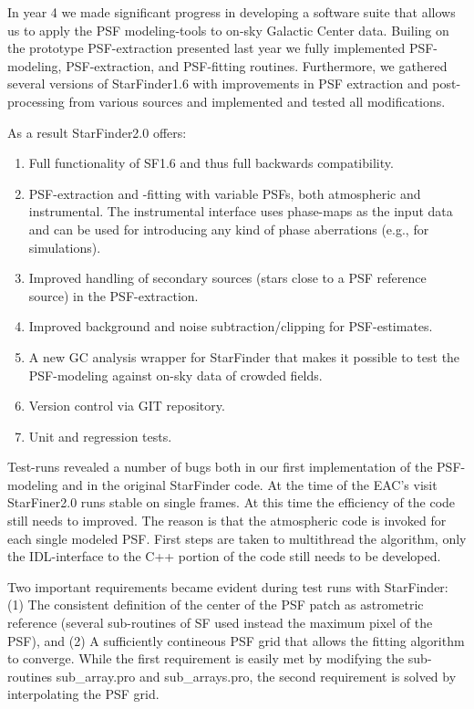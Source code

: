 In year 4 we made significant progress in developing a software suite that allows us to apply the PSF modeling-tools to on-sky Galactic Center data. Builing on the prototype PSF-extraction presented last year we fully implemented PSF-modeling, PSF-extraction, and PSF-fitting routines. Furthermore, we gathered several versions of StarFinder1.6 with improvements in PSF extraction and post-processing from various sources and implemented and tested all modifications.

As a result StarFinder2.0 offers:
\begin{enumerate}
\item Full functionality of SF1.6 and thus full backwards compatibility.
\item PSF-extraction and -fitting with variable PSFs, both atmospheric and instrumental. The instrumental interface uses phase-maps as the input data and can be used for introducing any kind of phase aberrations (e.g., for simulations).
\item Improved handling of secondary sources (stars close to a PSF reference source) in the PSF-extraction.
\item Improved background and noise subtraction/clipping for PSF-estimates.
\item A new GC analysis wrapper for StarFinder that makes it possible to test the PSF-modeling against on-sky data of crowded fields.
\item Version control via GIT repository.
\item Unit and regression tests.
\end{enumerate}
  
Test-runs revealed a number of bugs both in our first implementation of the PSF-modeling and in the original StarFinder code. At the time of the EAC's visit StarFiner2.0 runs stable on single frames. At this time the efficiency of the code still needs to improved. The reason is that the atmospheric code is invoked for each single modeled PSF. First steps are taken to multithread the algorithm, only the IDL-interface to the C++ portion of the code still needs to be developed.

Two important requirements became evident during test runs with StarFinder: (1) The consistent definition of the center of the PSF patch as astrometric reference (several sub-routines of SF used instead the maximum pixel of the PSF), and (2) A sufficiently contineous PSF grid that allows the fitting algorithm to converge. While the first requirement is easily met by modifying the sub-routines sub_array.pro and sub_arrays.pro, the second requirement is solved by interpolating the PSF grid. 
  
  
  